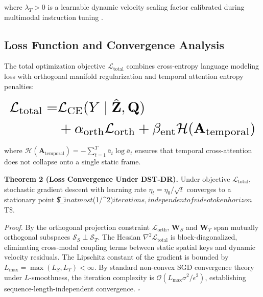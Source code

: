 \documentclass[manuscript,review]{acmart}
\begin{document}
where $\lambda_T > 0$ is a learnable dynamic velocity scaling factor calibrated during multimodal instruction tuning \cite{arxiv_2305_18290}.




\subsection{Loss Function and Convergence Analysis}


The total optimization objective $\mathcal{L}_{\text{total}}$ combines cross-entropy language modeling loss with orthogonal manifold regularization and temporal attention entropy penalties:

















\begin{equation}
\resizebox{\columnwidth}{!}{$\displaystyle
\begin{aligned}
\mathcal{L}_{\text{total}} = & \mathcal{L}_{\text{CE}}(Y \mid \hat{\mathbf{Z}}, \mathbf{Q}) \\
& + \alpha_{\text{orth}} \mathcal{L}_{\text{orth}} + \beta_{\text{ent}} \mathcal{H}(\mathbf{A}_{\text{temporal}})
\end{aligned}
$}
\end{equation}

















where $\mathcal{H}(\mathbf{A}_{\text{temporal}}) = -\sum_{t=1}^T \bar{a}_t \log \bar{a}_t$ ensures that temporal cross-attention does not collapse onto a single static frame.

\textbf{Theorem 2 (Loss Convergence Under DST-DR).} Under objective $\mathcal{L}_{\text{total}}$, stochastic gradient descent with learning rate $\eta_t = \eta_0 / \sqrt{t}$ converges to a stationary point \$\|\nabla {}\_{}\| \le \epsilon$ in at most $(1/\epsilon^2)$ iterations, independent of video token horizon $T\$.

\textit{Proof.} By the orthogonal projection constraint $\mathcal{L}_{\text{orth}}$, $\mathbf{W}_S$ and $\mathbf{W}_T$ span mutually orthogonal subspaces $\mathcal{S}_S \perp \mathcal{S}_T$. The Hessian $\nabla^2 \mathcal{L}_{\text{total}}$ is block-diagonalized, eliminating cross-modal coupling terms between static spatial keys and dynamic velocity residuals. The Lipschitz constant of the gradient is bounded by $L_{\max} = \max(L_S, L_T) < \infty$. By standard non-convex SGD convergence theory under $L$-smoothness, the iteration complexity is $\mathcal{O}(L_{\max} \sigma^2 / \epsilon^2)$, establishing sequence-length-independent convergence. $\square$
\end{document}
